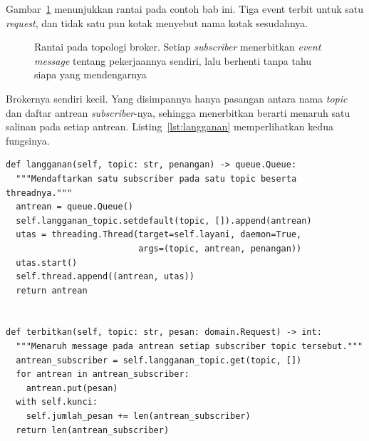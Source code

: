 Gambar~\ref{fig:rantai-broker} menunjukkan rantai pada contoh bab ini. Tiga
event terbit untuk satu \textit{request}, dan tidak satu pun kotak menyebut nama
kotak sesudahnya.

\begin{figure}[htbp]
  \centering
  \caption{Rantai pada topologi broker. Setiap \textit{subscriber} menerbitkan \textit{event message}
    tentang pekerjaannya sendiri, lalu berhenti tanpa tahu siapa yang
    mendengarnya}
  \label{fig:rantai-broker}
\end{figure}

Brokernya sendiri kecil. Yang disimpannya hanya pasangan antara nama \textit{topic} dan
daftar antrean \textit{subscriber}-nya, sehingga menerbitkan berarti menaruh satu salinan
pada setiap antrean. Listing~\ref{lst:langganan} memperlihatkan kedua
fungsinya.

\begin{lstlisting}[style=PythonStyle, caption={Inti broker, tersedia di
  \berkas{sources/chapter09/broker.py}}, label=lst:langganan]
def langganan(self, topic: str, penangan) -> queue.Queue:
  """Mendaftarkan satu subscriber pada satu topic beserta threadnya."""
  antrean = queue.Queue()
  self.langganan_topic.setdefault(topic, []).append(antrean)
  utas = threading.Thread(target=self.layani, daemon=True,
                          args=(topic, antrean, penangan))
  utas.start()
  self.thread.append((antrean, utas))
  return antrean


def terbitkan(self, topic: str, pesan: domain.Request) -> int:
  """Menaruh message pada antrean setiap subscriber topic tersebut."""
  antrean_subscriber = self.langganan_topic.get(topic, [])
  for antrean in antrean_subscriber:
    antrean.put(pesan)
  with self.kunci:
    self.jumlah_pesan += len(antrean_subscriber)
  return len(antrean_subscriber)
\end{lstlisting}

